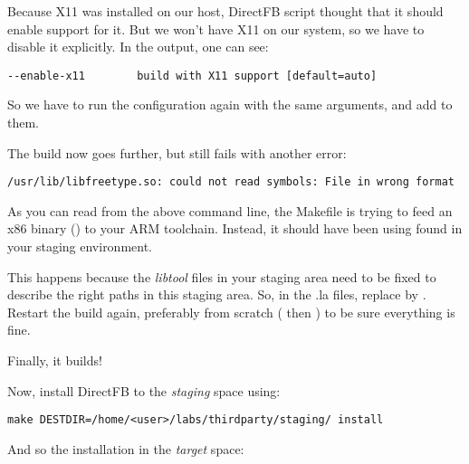 Because X11 was installed on our host, DirectFB 
script thought that it should enable support for it. But we won't have
X11 on our system, so we have to disable it explicitly. In the
 output, one can see:

\begin{verbatim}
--enable-x11		build with X11 support [default=auto]
\end{verbatim}

So we have to run the configuration again with the same arguments, and
add  to them.

The build now goes further, but still fails with another error:

\begin{verbatim}
/usr/lib/libfreetype.so: could not read symbols: File in wrong format
\end{verbatim}

As you can read from the above command line, the Makefile is trying to
feed an x86 binary () to your ARM
toolchain. Instead, it should have been using
 found in your staging environment.

This happens because the {\em libtool}  files in your
staging area need to be fixed to describe the right paths in this
staging area. So, in the .la files, replace 
by
. Restart
the build again, preferably from scratch ( then
) to be sure everything is fine.

Finally, it builds!

Now, install DirectFB to the {\em staging} space using:

\begin{verbatim}
make DESTDIR=/home/<user>/labs/thirdparty/staging/ install
\end{verbatim}

And so the installation in the {\em target} space:

